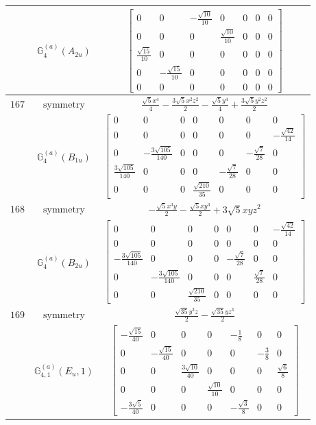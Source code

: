 \documentclass[fleqn,8pt,landscape]{jsarticle}
\begin{document}
\begin{longtable}{ccc}
$  $ & $ \mathbb{G}_{4}^{(a)}(A_{2u}) $ & $ \begin{bmatrix} 0 & 0 & - \frac{\sqrt{10}}{10} & 0 & 0 & 0 & 0 \\ 0 & 0 & 0 & \frac{\sqrt{10}}{10} & 0 & 0 & 0 \\ \frac{\sqrt{15}}{10} & 0 & 0 & 0 & 0 & 0 & 0 \\ 0 & - \frac{\sqrt{15}}{10} & 0 & 0 & 0 & 0 & 0 \\ 0 & 0 & 0 & 0 & 0 & 0 & 0 \end{bmatrix} $ \\ \hline
$ 167 $ & $ \text{symmetry} $ & $ \frac{\sqrt{5} x^{4}}{4} - \frac{3 \sqrt{5} x^{2} z^{2}}{2} - \frac{\sqrt{5} y^{4}}{4} + \frac{3 \sqrt{5} y^{2} z^{2}}{2} $ \\
$  $ & $ \mathbb{G}_{4}^{(a)}(B_{1u}) $ & $ \begin{bmatrix} 0 & 0 & 0 & 0 & 0 & 0 & 0 \\ 0 & 0 & 0 & 0 & 0 & 0 & - \frac{\sqrt{42}}{14} \\ 0 & - \frac{3 \sqrt{105}}{140} & 0 & 0 & 0 & - \frac{\sqrt{7}}{28} & 0 \\ \frac{3 \sqrt{105}}{140} & 0 & 0 & 0 & - \frac{\sqrt{7}}{28} & 0 & 0 \\ 0 & 0 & 0 & \frac{\sqrt{210}}{35} & 0 & 0 & 0 \end{bmatrix} $ \\ \hline
$ 168 $ & $ \text{symmetry} $ & $ - \frac{\sqrt{5} x^{3} y}{2} - \frac{\sqrt{5} x y^{3}}{2} + 3 \sqrt{5} x y z^{2} $ \\
$  $ & $ \mathbb{G}_{4}^{(a)}(B_{2u}) $ & $ \begin{bmatrix} 0 & 0 & 0 & 0 & 0 & 0 & - \frac{\sqrt{42}}{14} \\ 0 & 0 & 0 & 0 & 0 & 0 & 0 \\ - \frac{3 \sqrt{105}}{140} & 0 & 0 & 0 & - \frac{\sqrt{7}}{28} & 0 & 0 \\ 0 & - \frac{3 \sqrt{105}}{140} & 0 & 0 & 0 & \frac{\sqrt{7}}{28} & 0 \\ 0 & 0 & \frac{\sqrt{210}}{35} & 0 & 0 & 0 & 0 \end{bmatrix} $ \\ \hline
$ 169 $ & $ \text{symmetry} $ & $ \frac{\sqrt{35} y^{3} z}{2} - \frac{\sqrt{35} y z^{3}}{2} $ \\
$  $ & $ \mathbb{G}_{4,1}^{(a)}(E_{u},1) $ & $ \begin{bmatrix} - \frac{\sqrt{15}}{40} & 0 & 0 & 0 & - \frac{1}{8} & 0 & 0 \\ 0 & - \frac{\sqrt{15}}{40} & 0 & 0 & 0 & - \frac{3}{8} & 0 \\ 0 & 0 & \frac{3 \sqrt{10}}{40} & 0 & 0 & 0 & \frac{\sqrt{6}}{8} \\ 0 & 0 & 0 & \frac{\sqrt{10}}{10} & 0 & 0 & 0 \\ - \frac{3 \sqrt{5}}{40} & 0 & 0 & 0 & - \frac{\sqrt{3}}{8} & 0 & 0 \end{bmatrix} $ \\ \hline

\end{longtable}
\end{document}
